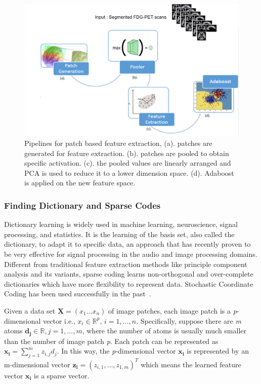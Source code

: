\documentclass[authoryear,preprint,revi	ew,12pt]{elsarticle}
\begin{document}
\begin{figure}
	\centering
	\includegraphics[width=\linewidth]{figures/pipeline2.png}
	\caption[Pipelines for Patch based Feature Extraction]{Pipelines for patch based feature extraction, (a). patches are generated for feature extraction. (b). patches are pooled to obtain specific activation. (c). the pooled values are linearly arranged and PCA is used to reduce it to a lower dimension space. (d). Adaboost is applied on the new feature space.}
	\label{fig:pipeline}
\end{figure}

\subsubsection{Finding Dictionary and Sparse Codes}
\label{sec:dictionary_learning}
Dictionary learning is widely used in machine learning, neuroscience, signal processing, and statistics. It is the learning of the basis set, also called the dictionary, to adapt it to specific data, an approach that has recently proven to be very effective for signal processing in the audio and image processing domains. Different from traditional feature extraction methods like principle component analysis and its variants, sparse coding learns non-orthogonal and over-complete dictionaries which have more flexibility to represent data. Stochastic Coordinate Coding has been used successfully in the past~\citep{lin2014stochastic,mairal2009online}. 

Given a data set $\mathbf{X} = (x_1 \dots x_n)$ of image patches, each image patch is a {\em p}-dimensional vector i.e., $ x_i \in \mathbb{R}^{p} $, $ i = 1, \dots, n $. Specifically, suppose there are \emph{m} atoms $ \mathbf{d_j} \in \mathbb{R}, j = 1,\dots,m $, where the number of atoms is usually much smaller than the number of image patch {\em p}. Each patch can be represented as $ \mathbf{x_i} =  \sum^m_{j=1} z_{i,j}d_j $. In this way, the {\em p}-dimensional vector $ \mathbf{x_i} $ is represented by an m-dimensional vector $  \mathbf{z_i} = (z_{i,1},\dots,z_{1,m})^T $ which means the learned feature vector $ \mathbf{x_i} $ is a sparse vector. 
\end{document}
